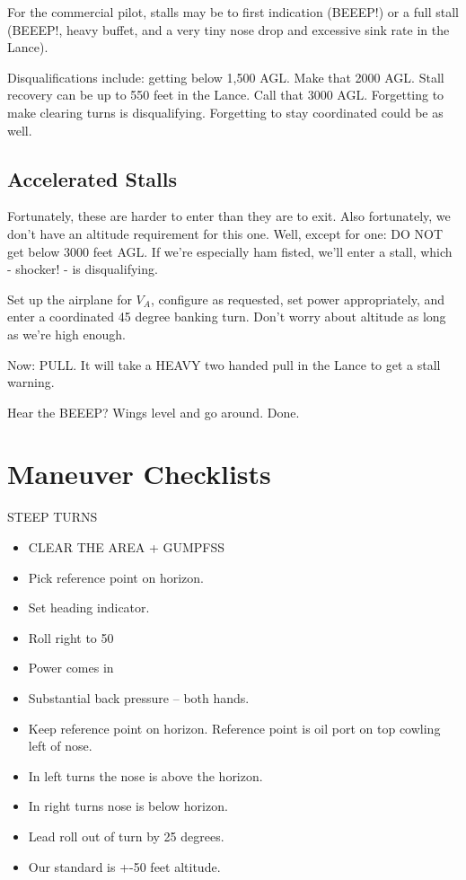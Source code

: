 For the commercial pilot, stalls may be to first indication (BEEEP!) or a full stall (BEEEP!, heavy buffet, and a very tiny nose drop and excessive sink rate in the Lance).

Disqualifications include: getting below 1,500 AGL. Make that 2000 AGL. Stall recovery can be up to 550 feet in the Lance. Call that 3000 AGL. Forgetting to make clearing turns is disqualifying. Forgetting to stay coordinated could be as well.

\subsection{Accelerated Stalls}

Fortunately, these are harder to enter than they are to exit. Also fortunately, we don't have an altitude requirement for this one. Well, except for one: DO NOT get below 3000 feet AGL. If we're especially ham fisted, we'll enter a stall, which - shocker! - is disqualifying.

Set up the airplane for $V_A$, configure as requested, set power appropriately, and enter a coordinated 45 degree banking turn. Don't worry about altitude as long as we're high enough.

Now: PULL. It will take a HEAVY two handed pull in the Lance to get a stall warning.

Hear the BEEEP? Wings level and go around. Done.

\section{Maneuver Checklists}

STEEP TURNS
\begin{itemize}
    \item CLEAR THE AREA + GUMPFSS
    \item Pick reference point on horizon.
    \item Set heading indicator.
    \item Roll right to 50
    \item Power comes in
    \item Substantial back pressure – both hands.
    \item Keep reference point on horizon. Reference point is oil port on top cowling left of nose.
    \item In left turns the nose is above the horizon.
    \item In right turns nose is below horizon.
    \item Lead roll out of turn by 25 degrees.
    \item Our standard is +-50 feet altitude.
\end{itemize}

